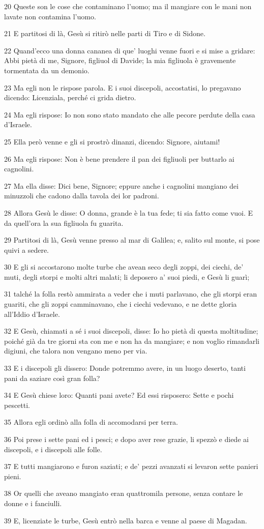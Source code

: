 \par 20 Queste son le cose che contaminano l'uomo; ma il mangiare con le mani non lavate non contamina l'uomo.
\par 21 E partitosi di là, Gesù si ritirò nelle parti di Tiro e di Sidone.
\par 22 Quand'ecco una donna cananea di que' luoghi venne fuori e si mise a gridare: Abbi pietà di me, Signore, figliuol di Davide; la mia figliuola è gravemente tormentata da un demonio.
\par 23 Ma egli non le rispose parola. E i suoi discepoli, accostatisi, lo pregavano dicendo: Licenziala, perché ci grida dietro.
\par 24 Ma egli rispose: Io non sono stato mandato che alle pecore perdute della casa d'Israele.
\par 25 Ella però venne e gli si prostrò dinanzi, dicendo: Signore, aiutami!
\par 26 Ma egli rispose: Non è bene prendere il pan dei figliuoli per buttarlo ai cagnolini.
\par 27 Ma ella disse: Dici bene, Signore; eppure anche i cagnolini mangiano dei minuzzoli che cadono dalla tavola dei lor padroni.
\par 28 Allora Gesù le disse: O donna, grande è la tua fede; ti sia fatto come vuoi. E da quell'ora la sua figliuola fu guarita.
\par 29 Partitosi di là, Gesù venne presso al mar di Galilea; e, salito sul monte, si pose quivi a sedere.
\par 30 E gli si accostarono molte turbe che avean seco degli zoppi, dei ciechi, de' muti, degli storpi e molti altri malati; li deposero a' suoi piedi, e Gesù li guarì;
\par 31 talché la folla restò ammirata a veder che i muti parlavano, che gli storpi eran guariti, che gli zoppi camminavano, che i ciechi vedevano, e ne dette gloria all'Iddio d'Israele.
\par 32 E Gesù, chiamati a sé i suoi discepoli, disse: Io ho pietà di questa moltitudine; poiché già da tre giorni sta con me e non ha da mangiare; e non voglio rimandarli digiuni, che talora non vengano meno per via.
\par 33 E i discepoli gli dissero: Donde potremmo avere, in un luogo deserto, tanti pani da saziare così gran folla?
\par 34 E Gesù chiese loro: Quanti pani avete? Ed essi risposero: Sette e pochi pescetti.
\par 35 Allora egli ordinò alla folla di accomodarsi per terra.
\par 36 Poi prese i sette pani ed i pesci; e dopo aver rese grazie, li spezzò e diede ai discepoli, e i discepoli alle folle.
\par 37 E tutti mangiarono e furon saziati; e de' pezzi avanzati si levaron sette panieri pieni.
\par 38 Or quelli che aveano mangiato eran quattromila persone, senza contare le donne e i fanciulli.
\par 39 E, licenziate le turbe, Gesù entrò nella barca e venne al paese di Magadan.

